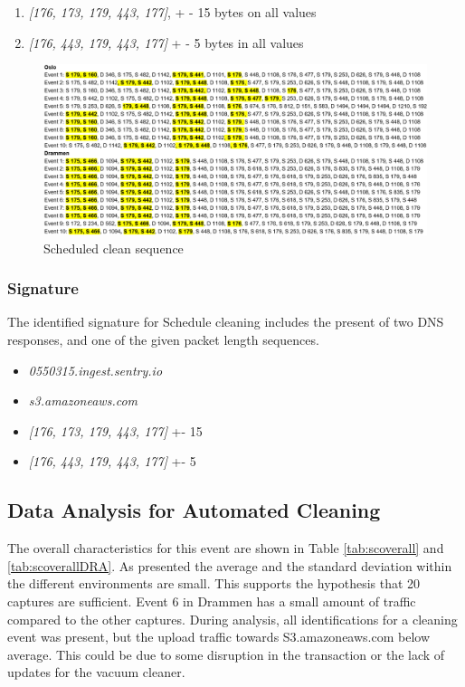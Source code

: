 \begin{enumerate}
    \item \textit{[176, 173, 179, 443, 177]}, + - 15 bytes on all values 
    \item \textit{[176, 443, 179, 443, 177]} + - 5 bytes in all values
\end{enumerate}

\begin{figure}[H]
    \centering
    \includegraphics[width=\textwidth]{figures/Sequence_SC.png}
    \caption{Scheduled clean sequence}
    \label{fig:Scseq}
\end{figure}

\subsubsection{Signature}
The identified signature for Schedule cleaning includes the present of two DNS responses, and one of the given packet length sequences.  

\begin{itemize}
    \item \textit{0550315.ingest.sentry.io}
    \item \textit{s3.amazoneaws.com}
    \item \textit{[176, 173, 179, 443, 177]} +- 15
    \item \textit{[176, 443, 179, 443, 177]} +- 5
\end{itemize}

\subsection{Data Analysis for Automated Cleaning}
The overall characteristics for this event are shown in Table \ref{tab:scoverall} and \ref{tab:scoverallDRA}. As presented the average and the standard deviation within the different environments are small. This supports the hypothesis that 20 captures are sufficient. Event 6 in Drammen has a small amount of traffic compared to the other captures. During analysis, all identifications for a cleaning event was present, but the upload traffic towards S3.amazoneaws.com below average. This could be due to some disruption in the transaction or the lack of updates for the vacuum cleaner. 

